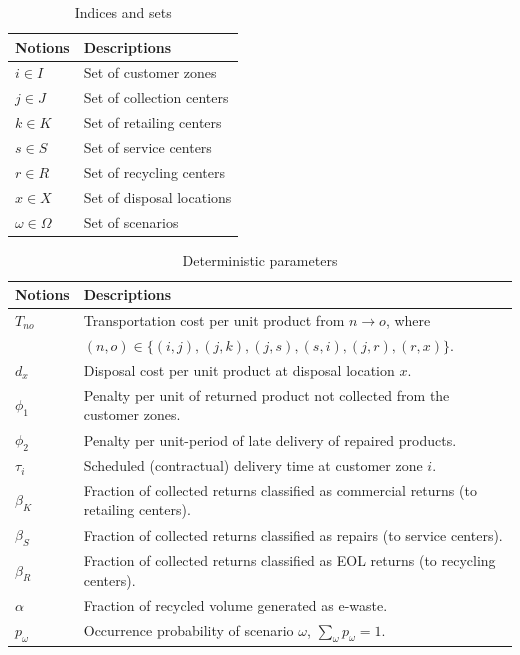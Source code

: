 \documentclass[11pt, a4paper]{article}
\begin{document}
\hypertarget{t1}{}
\begin{table}[!htb]
\footnotesize
\renewcommand{\arraystretch}{1.25}
\renewcommand{\arraystretch}{1.25}
\caption{Indices and sets}
\label{t1}
\begin{tabular}{p{2cm}p{6cm}}
\toprule
Notions & Descriptions\\
\midrule
$i \in I$ & Set of customer zones \\
$j \in J$ & Set of collection centers \\
$k \in K$ & Set of retailing centers \\
$s \in S$ & Set of service centers \\
$r \in R$ & Set of recycling centers \\
$x \in X$ & Set of disposal locations \\
$\omega \in \Omega$ & Set of scenarios \\
\bottomrule
\end{tabular}
\end{table}
\hypertarget{t2}{}
\begin{table}[!htb]
\footnotesize
\renewcommand{\arraystretch}{1.25}
\caption{Deterministic parameters}
\label{t2}
\begin{tabular}{p{2cm}p{13cm}}
\toprule
Notions & Descriptions\\
\midrule
$T_{no}$ & Transportation cost per unit product from $n \to o$, where\\
& $(n,o)\in\{(i,j),(j,k),(j,s),(s,i),(j,r),(r,x)\}$. \\
$d_x$ & Disposal cost per unit product at disposal location $x$. \\
$\phi_1$ & Penalty per unit of returned product not collected from the customer zones. \\
$\phi_2$ & Penalty per unit-period of late delivery of repaired products. \\
$\tau_i$ & Scheduled (contractual) delivery time at customer zone $i$. \\
$\beta_{K}$ & Fraction of collected returns classified as commercial returns (to retailing centers). \\
$\beta_{S}$ & Fraction of collected returns classified as repairs (to service centers). \\
$\beta_{R}$ & Fraction of collected returns classified as EOL returns (to recycling centers). \\
$\alpha$ & Fraction of recycled volume generated as e-waste. \\
$p_{\omega}$ & Occurrence probability of scenario $\omega$, $\sum\limits_{\omega} p_{\omega}=1$. \\
\bottomrule
\end{tabular}
\end{table}
\end{document}
